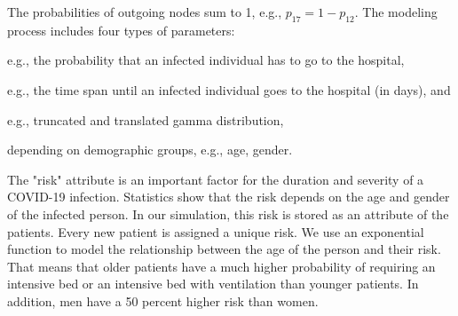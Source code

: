 \documentclass[conference]{IEEEtran}
\renewenvironment{description}[0]{\begin{compactdesc}}{\end{compactdesc}}
\begin{document}
The probabilities of outgoing nodes sum to 1, e.g., $p_{17} = 1 - p_{12}$.
The modeling process includes four types of parameters: 
\begin{description}
\item[transition probabilities,] e.g., the probability that an infected individual has to go to the hospital,
\item[durations,] e.g., the time span until an infected individual goes to the hospital (in days), and
\item[distribution properties,] e.g., truncated and translated gamma distribution,
\item[risk factors] depending on demographic groups, e.g., age, gender. 
\end{description}

The "risk" attribute is an important factor for the duration and severity of a COVID-19 infection. 
Statistics show that the risk depends on the age and gender of the infected person. 
In our simulation, this risk is stored as an attribute of the patients. 
Every new patient is assigned a unique risk. 
We use an exponential function to model the relationship between the age of the person and their risk.
That means that older patients have a much higher probability of requiring an intensive bed or an intensive bed with ventilation than younger patients. 
In addition, men have a 50 percent higher risk than women. 
\end{document}
